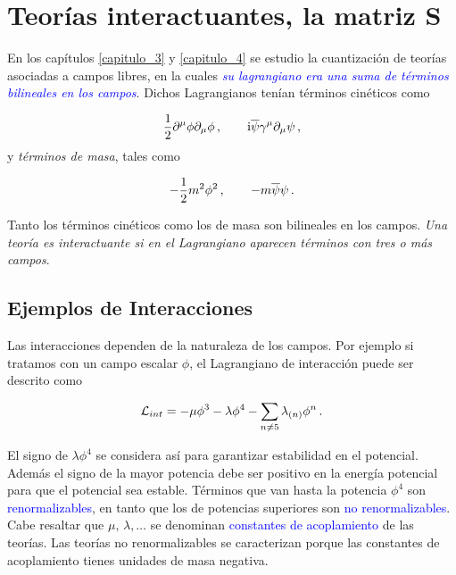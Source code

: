 

\chapter{Teorías interactuantes, la matriz S}

\label{capitulo_5}

En los capítulos \ref{capitulo_3} y \ref{capitulo_4} se estudio la cuantización de teorías asociadas a campos libres, en la cuales \emph{\textcolor{blue}{su lagrangiano era una suma de términos bilineales en los campos}}. Dichos Lagrangianos tenían términos cinéticos como

\begin{equation}
	\frac{1}{2} \partial^\mu \phi \partial_\mu \phi \, , \qquad   \mathrm{i} \overline{\psi} \gamma^\mu \partial _\mu \psi \, , 
\end{equation}
y \emph{términos de masa}, tales como 

\begin{equation}
	-\frac{1}{2} m^2 \phi^2 \, , \qquad -m\overline{\psi} \psi \, .
\end{equation}

Tanto los términos cinéticos como los de masa son bilineales en los campos. \emph{Una teoría es interactuante si en el Lagrangiano aparecen términos con tres o más campos}.\\

\section{Ejemplos de Interacciones} 

Las interacciones dependen de la naturaleza de los campos. Por ejemplo si tratamos con un campo escalar $\phi$, el Lagrangiano de interacción puede ser descrito como

\begin{equation}
	\mathcal{L}_{int} = -\mu \phi^3 - \lambda \phi^4 - \sum_{n \neq 5} \lambda_{\qty(n)} \phi^n \, .
\end{equation}

El signo de $\lambda \phi^4$ se considera así para garantizar estabilidad en el potencial. Además el signo de la mayor potencia debe ser positivo en la energía potencial para que el potencial sea estable. Términos que van hasta la potencia $\phi^4$ son \textcolor{blue}{renormalizables}, en tanto que los de potencias superiores son \textcolor{blue}{no renormalizables}. Cabe resaltar que $\mu, \, \lambda, \ldots$ se denominan \textcolor{blue}{constantes de acoplamiento} de las teorías. Las teorías no renormalizables se caracterizan porque las constantes de acoplamiento tienes unidades de masa negativa.\\

